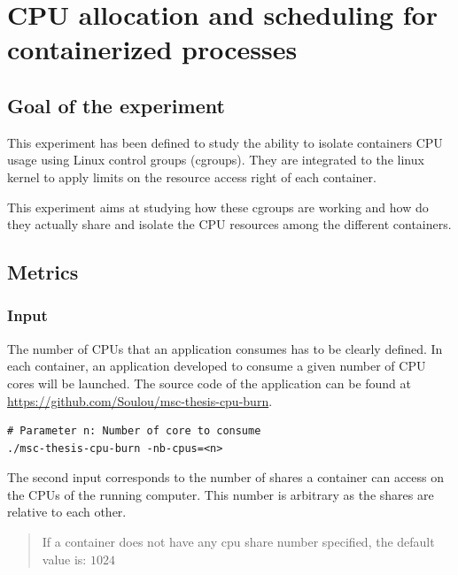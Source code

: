 \chapter{CPU allocation and scheduling for containerized processes}
\label{cpuallocation}

\section{Goal of the experiment}

This experiment has been defined to study the ability to isolate containers CPU
usage using Linux control groups (cgroups). They are integrated to the linux
kernel to apply limits on the resource access right of each container.

This experiment aims at studying how these cgroups are working and how do they
actually share and isolate the CPU resources among the different containers.

\section{Metrics}

\subsection{Input}

The number of CPUs that an application consumes has to be clearly defined. In
each container, an application developed to consume a given number of CPU
cores will be launched. The source code of the application can be found at
\url{https://github.com/Soulou/msc-thesis-cpu-burn}.

\vspace{1em}
\lstset{language=bash}

\begin{lstlisting}
# Parameter n: Number of core to consume
./msc-thesis-cpu-burn -nb-cpus=<n>
\end{lstlisting}

The second input corresponds to the number of shares a container can access on
the CPUs of the running computer. This number is arbitrary as the shares are
relative to each other. 

\begin{quote}
If a container does not have any cpu share number specified, the default value
is: $1024$
\end{quote}

